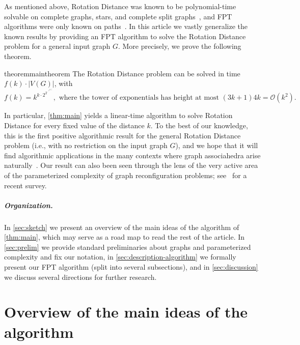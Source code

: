 \documentclass[a4paper,UKenglish,cleveref, autoref, thm-restate]{lipics-v2021}
\newcommand{\Ocal}{{\mathcal O}\xspace}
\newcommand{\FPT}{{\sf FPT}\xspace}
\newcommand{\kelimination}{{\sc Rotation Distance}\xspace}
\begin{document}
As mentioned above, \kelimination was known to be polynomial-time solvable on complete graphs, stars, and complete split graphs~\cite{CardinalPV24}, and \FPT algorithms were only known on paths~\cite{cleary2009rotation,kanj2017computing,li20233,lubiw2015flip,Lucas10}.
In this article we vastly generalize the known results by providing an \FPT algorithm to solve the \kelimination problem for a general input graph $G$. More precisely, we prove the following theorem.

\begin{restatable}{theorem}{maintheorem}\label{thm:main}
The  \kelimination problem can be solved in time $f(k) \cdot |V(G)|$, with
\vspace{-.25cm}
\begin{equation*}\label{eq:main-running-time}
    f(k) = k^{k \cdot 2^{2^{.^{.^{.{2^{\Ocal(k^2)}}}}}}}, \text{ where the tower of exponentials has height at most  $(3k+1)4k = \Ocal(k^2)$.}
\end{equation*}
\end{restatable}

In particular, \autoref{thm:main} yields a linear-time algorithm to solve \kelimination for every fixed value of the distance $k$. To the best of our knowledge, this is the first positive algorithmic result for the general \kelimination problem (i.e., with no restriction on the input graph $G$), and we hope that it will find algorithmic applications in the many contexts where graph associahedra arise naturally~\cite{Devadoss09,CarrD06,Postnikov09,cardinal2022efficient,MannevilleP10,ito_et_al:LIPIcs.ICALP.2023.82}.
Our result can also been seen through the lens of the very active area of the parameterized complexity of graph reconfiguration problems; see~\cite{BousquetMNS24} for a recent survey.




\subparagraph*{Organization.} In \autoref{sec:sketch} we present an overview of the main ideas of the algorithm of \autoref{thm:main}, which may serve as a road map to read the rest of the article. In \autoref{sec:prelim} we provide standard preliminaries about graphs and parameterized complexity and fix our notation, in \autoref{sec:description-algorithm} we formally present our \FPT algorithm (split into several subsections), and in \autoref{sec:discussion} we discuss several directions for further research.



\section{Overview of the main ideas of the algorithm}
\label{sec:sketch}
\end{document}
